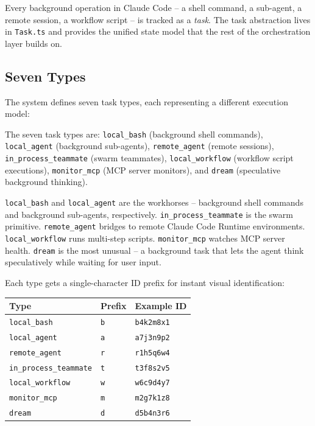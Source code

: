 \documentclass[
  english,
  11pt,
  letterpaper,
]{book}
\begin{document}
Every background operation in Claude Code -- a shell command, a
sub-agent, a remote session, a workflow script -- is tracked as a
\emph{task}. The task abstraction lives in \texttt{Task.ts} and provides
the unified state model that the rest of the orchestration layer builds
on.

\subsection{Seven Types}\label{seven-types}

The system defines seven task types, each representing a different
execution model:

The seven task types are: \texttt{local\_bash} (background shell
commands), \texttt{local\_agent} (background sub-agents),
\texttt{remote\_agent} (remote sessions), \texttt{in\_process\_teammate}
(swarm teammates), \texttt{local\_workflow} (workflow script
executions), \texttt{monitor\_mcp} (MCP server monitors), and
\texttt{dream} (speculative background thinking).

\texttt{local\_bash} and \texttt{local\_agent} are the workhorses --
background shell commands and background sub-agents, respectively.
\texttt{in\_process\_teammate} is the swarm primitive.
\texttt{remote\_agent} bridges to remote Claude Code Runtime
environments. \texttt{local\_workflow} runs multi-step scripts.
\texttt{monitor\_mcp} watches MCP server health. \texttt{dream} is the
most unusual -- a background task that lets the agent think
speculatively while waiting for user input.

Each type gets a single-character ID prefix for instant visual
identification:

\begin{longtable}[]{@{}lll@{}}
\toprule\noalign{}
Type & Prefix & Example ID \\
\midrule\noalign{}
\endhead
\bottomrule\noalign{}
\endlastfoot
\texttt{local\_bash} & \texttt{b} & \texttt{b4k2m8x1} \\
\texttt{local\_agent} & \texttt{a} & \texttt{a7j3n9p2} \\
\texttt{remote\_agent} & \texttt{r} & \texttt{r1h5q6w4} \\
\texttt{in\_process\_teammate} & \texttt{t} & \texttt{t3f8s2v5} \\
\texttt{local\_workflow} & \texttt{w} & \texttt{w6c9d4y7} \\
\texttt{monitor\_mcp} & \texttt{m} & \texttt{m2g7k1z8} \\
\texttt{dream} & \texttt{d} & \texttt{d5b4n3r6} \\
\end{longtable}
\end{document}
